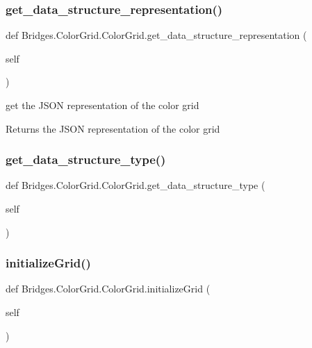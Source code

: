 \subsubsection{\texorpdfstring{get\+\_\+data\+\_\+structure\+\_\+representation()}{get\_data\_structure\_representation()}}
{\footnotesize\ttfamily def Bridges.\+Color\+Grid.\+Color\+Grid.\+get\+\_\+data\+\_\+structure\+\_\+representation (\begin{DoxyParamCaption}\item[{}]{self }\end{DoxyParamCaption})}



get the J\+S\+ON representation of the color grid 

\begin{DoxyReturn}{Returns}
the J\+S\+ON representation of the color grid 
\end{DoxyReturn}
\mbox{\label{class_bridges_1_1_color_grid_1_1_color_grid_a34e609e12f3f5fa2bf8917b2bd2b5489}} 
\subsubsection{\texorpdfstring{get\+\_\+data\+\_\+structure\+\_\+type()}{get\_data\_structure\_type()}}
{\footnotesize\ttfamily def Bridges.\+Color\+Grid.\+Color\+Grid.\+get\+\_\+data\+\_\+structure\+\_\+type (\begin{DoxyParamCaption}\item[{}]{self }\end{DoxyParamCaption})}

\mbox{\label{class_bridges_1_1_color_grid_1_1_color_grid_add4d644d5a7703acf2569a6fdd95f814}} 
\subsubsection{\texorpdfstring{initialize\+Grid()}{initializeGrid()}}
{\footnotesize\ttfamily def Bridges.\+Color\+Grid.\+Color\+Grid.\+initialize\+Grid (\begin{DoxyParamCaption}\item[{}]{self }\end{DoxyParamCaption})}



